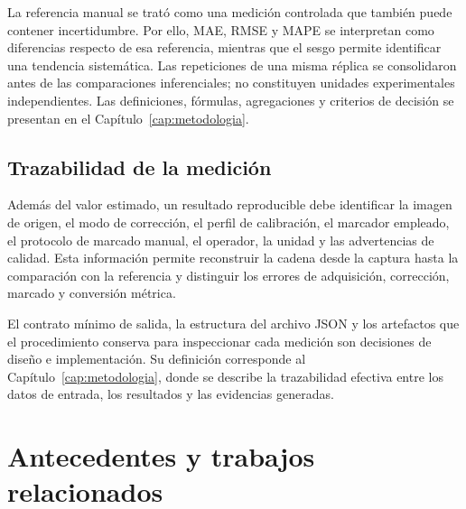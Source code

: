 \documentclass{report}
\begin{document}
La referencia manual se trató como una medición controlada que también puede contener incertidumbre. Por ello, MAE, RMSE y MAPE se interpretan como diferencias respecto de esa referencia, mientras que el sesgo permite identificar una tendencia sistemática. Las repeticiones de una misma réplica se consolidaron antes de las comparaciones inferenciales; no constituyen unidades experimentales independientes. Las definiciones, fórmulas, agregaciones y criterios de decisión se presentan en el Capítulo~\ref{cap:metodologia}.

\subsection{Trazabilidad de la medición}

Además del valor estimado, un resultado reproducible debe identificar la imagen de origen, el modo de corrección, el perfil de calibración, el marcador empleado, el protocolo de marcado manual, el operador, la unidad y las advertencias de calidad. Esta información permite reconstruir la cadena desde la captura hasta la comparación con la referencia y distinguir los errores de adquisición, corrección, marcado y conversión métrica.

El contrato mínimo de salida, la estructura del archivo JSON y los artefactos que el procedimiento conserva para inspeccionar cada medición son decisiones de diseño e implementación. Su definición corresponde al Capítulo~\ref{cap:metodologia}, donde se describe la trazabilidad efectiva entre los datos de entrada, los resultados y las evidencias generadas.

\section{Antecedentes y trabajos relacionados}
\label{sec:antecedentes}
\end{document}
